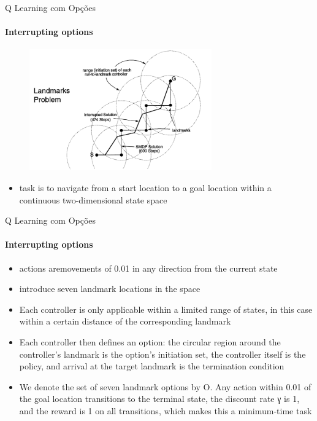 \begin{frame}{Q Learning com Opções}
    \framesubtitle{Interrupting options}
    \begin{figure}
        \centering
        \includegraphics[width=0.7\textwidth]{img/landmarkProblem.png}
        \label{figLandmarkProblem}
    \end{figure}
    \begin{itemize}
        \item task is to navigate from a start location to a goal location within a continuous two-dimensional state space
    \end{itemize}
\end{frame}

\begin{frame}{Q Learning com Opções}
    \framesubtitle{Interrupting options}
    \begin{itemize}
        \item actions aremovements of 0.01 in any direction from the current state
        \item introduce seven landmark locations in the space
        \item Each controller is only applicable within a limited range of states, in this case within a certain distance of the corresponding landmark
        \item Each controller then defines an option: the circular region around the controller’s landmark is the option’s initiation set, the controller itself is the policy, and arrival at the target landmark is the termination condition
        \item We denote the set of seven landmark options by O. Any action within 0.01 of the goal location transitions to the terminal state, the discount rate γ is 1, and the reward is 1 on all transitions, which makes this a minimum-time task
    \end{itemize}
\end{frame}

